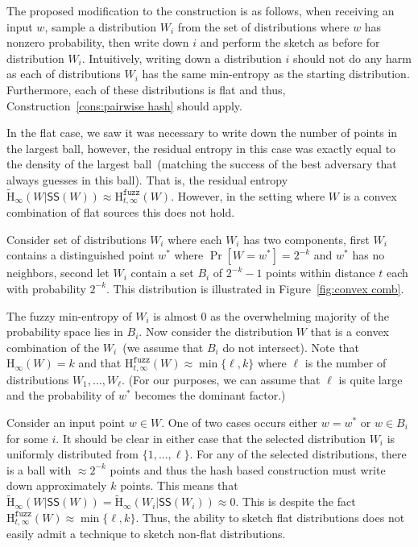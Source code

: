 \documentclass[11pt]{article}
\newcommand{\consref}[1]{\mbox{Construction~\ref{#1}}}
\newcommand{\figref}[1]{\mbox{Figure~\ref{#1}}}
\newcommand{\class}[1]{{\ensuremath{\mathsf{#1}}}}
\newcommand{\sketch}{\ensuremath{\class{SS}}\xspace}
\newcommand{\Hoo}{\mathrm{H}_\infty}
\newcommand{\Hav}{\tilde{\mathrm{H}}_\infty}
\newcommand{\Hfuzz}{\mathrm{H}^{\mathtt{fuzz}}_{t,\infty}}
\begin{document}
The proposed modification to the construction is as follows, when receiving an input $w$, sample a distribution $W_i$ from the set of distributions where $w$ has nonzero probability, then write down $i$ and perform the sketch as before for distribution $W_i$.  Intuitively, writing down a distribution $i$ should not do any harm as each of distributions $W_i$ has the same min-entropy as the starting distribution.  Furthermore, each of these distributions is flat and thus, \consref{cons:pairwise hash} should apply.

In the flat case, we saw it was necessary to write down the number of points in the largest ball, however, the residual entropy in this case was exactly equal to the density of the largest ball~(matching the success of the best adversary that always guesses in this ball).  That is, the residual entropy $\Hav(W|\sketch(W)) \approx \Hfuzz(W)$.  However, in the setting where $W$ is a convex combination of flat sources this does not hold.

Consider set of distributions $W_i$ where each $W_i$ has two components, first $W_i$ contains a distinguished point $w^*$ where $\Pr[W=w^*] = 2^{-k}$ and $w^*$ has no neighbors, second let $W_i$ contain a set $B_i$ of $2^{-k}-1$ points within distance $t$ each with probability $2^{-k}$.  This distribution is illustrated in \figref{fig:convex comb}.  

The fuzzy min-entropy of $W_i$ is almost $0$ as the overwhelming majority of the probability space lies in $B_i$.  Now consider the distribution $W$ that is a convex combination of the $W_i$~(we assume that $B_i$ do not intersect).  Note that $\Hoo(W)=k$ and that $\Hfuzz(W)\approx \min\{\ell, k\}$ where $\ell$ is the number of distributions $W_1,..., W_\ell$.  (For our purposes, we can assume that $\ell$ is quite large and the probability of $w^*$ becomes the dominant factor.)

Consider an input point $w\in W$.  One of two cases occurs either $w=w^*$ or $w\in B_i$ for some $i$.  It should be clear in either case that the selected distribution $W_i$ is uniformly distributed from $\{1,..., \ell\}$.  For any of the selected distributions, there is a ball with $\approx 2^{-k}$ points and thus the hash based construction must write down approximately $k$ points.  This means that $\Hav(W | \sketch(W))  = \Hav(W_i | \sketch(W_i)) \approx 0$.  This is despite the fact $\Hfuzz(W) \approx \min\{\ell, k\}$.  Thus, the ability to sketch flat distributions does not easily admit a technique to sketch non-flat distributions.  
\end{document}
